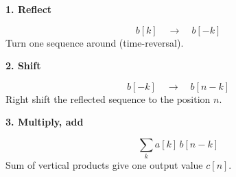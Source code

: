\documentclass[aspectratio=169,11pt]{beamer}
\begin{document}
\begin{frame}[plain]



\begin{center}

\begin{GreenCard}[
  width=\textwidth,
  top=8pt,
  bottom=8pt
]
\begin{minipage}[c]{0.22\textwidth}
{\Large\bfseries\color{ThemeGreen}1. Reflect}
\end{minipage}
\hfill
\begin{minipage}[c]{0.68\textwidth}
{\Large
\[
b[k]\quad\longrightarrow\quad b[-k]
\]
}
\vspace{-0.12cm}
{\normalsize Turn one sequence around (time-reversal).}
\end{minipage}
\end{GreenCard}

\vspace{0.02cm}

\begin{OrangeCard}[
  width=\textwidth,
  top=8pt,
  bottom=8pt
]
\begin{minipage}[c]{0.22\textwidth}
{\Large\bfseries\color{ThemeOrange}2. Shift}
\end{minipage}
\hfill
\begin{minipage}[c]{0.68\textwidth}
{\Large
\[
b[-k]\quad\longrightarrow\quad b[n-k]
\]
}
\vspace{-0.12cm}
{\normalsize Right shift the reflected sequence to the position \(n\).}
\end{minipage}
\end{OrangeCard}

\vspace{0.02cm}

\begin{BlueCard}[
  width=\textwidth,
  top=8pt,
  bottom=8pt
]
\begin{minipage}[c]{0.28\textwidth}
{\Large\bfseries\color{ThemeBlue}3. Multiply, add}
\end{minipage}
\hfill
\begin{minipage}[c]{0.62\textwidth}
{\Large 
\[
\sum_k a[k]\,b[n-k]
\]
}
\vspace{-0.12cm}
{\normalsize Sum of vertical products give one output value \(c[n]\).}
\end{minipage}
\end{BlueCard}


\end{center}
\end{frame}
\end{document}
